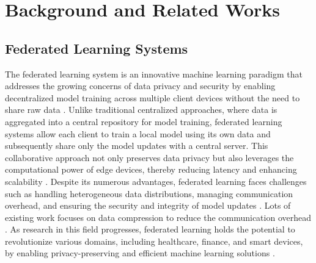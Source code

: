\section{Background and Related Works}


\subsection{Federated Learning Systems}

The federated learning system is an innovative machine learning paradigm that addresses the growing concerns of data privacy and security by enabling decentralized model training across multiple client devices without the need to share raw data \cite{baumgartNotAllFederated2024}. Unlike traditional centralized approaches, where data is aggregated into a central repository for model training, federated learning systems allow each client to train a local model using its own data and subsequently share only the model updates with a central server. This collaborative approach not only preserves data privacy but also leverages the computational power of edge devices, thereby reducing latency and enhancing scalability \cite{liFederatedOptimizationHeterogeneous}. Despite its numerous advantages, federated learning faces challenges such as handling heterogeneous data distributions, managing communication overhead, and ensuring the security and integrity of model updates \cite{karimireddySCAFFOLDStochasticControlled2020}. Lots of existing work focuses on data compression to reduce the communication overhead \cite{di2024survey,huang2024optimized,huang2023c}. As research in this field progresses, federated learning holds the potential to revolutionize various domains, including healthcare, finance, and smart devices, by enabling privacy-preserving and efficient machine learning solutions \cite{acarFederatedLearningBased2021a}.


